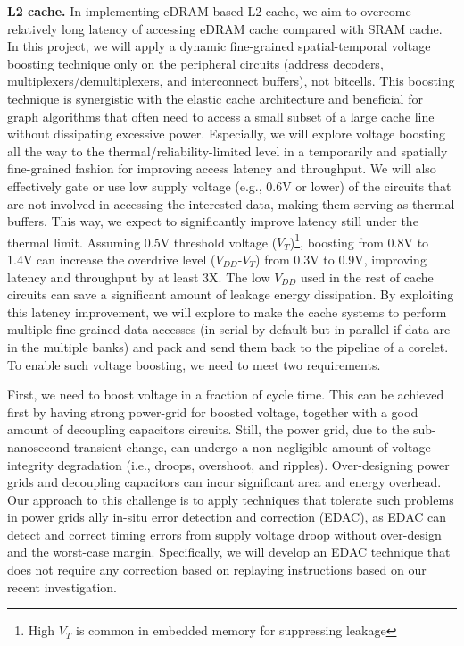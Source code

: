 \noindent
\textbf{L2 cache.}
In implementing eDRAM-based L2 cache, we aim to %
overcome relatively long latency of accessing eDRAM cache compared with SRAM cache. 
In this project, %
we will apply a dynamic fine-grained spatial-temporal voltage boosting technique only on the peripheral circuits (address decoders, multiplexers/demultiplexers, and interconnect buffers), not bitcells. 
This boosting technique is synergistic with the elastic cache architecture and beneficial for graph algorithms that often need to access a small subset of a large cache line without dissipating excessive power. 
Especially, we will explore voltage boosting all the way to the thermal/reliability-limited level in a temporarily and spatially fine-grained fashion for improving access latency and throughput. 
We will also effectively gate or use low supply voltage (e.g., 0.6V or lower) of the circuits that are not involved in accessing the interested data, making them serving as thermal buffers. 
This way, we expect to significantly improve latency still under the thermal limit. 
Assuming 0.5V threshold voltage ($V_T$)\footnote{High $V_T$ is common in embedded memory for suppressing leakage}, boosting from 0.8V to 1.4V can increase the overdrive level ($V_{DD}$-$V_T$) from 0.3V to 0.9V, improving latency and throughput by at least 3X. 
The low $V_{DD}$ used in the rest of cache circuits can save a significant amount of leakage energy dissipation. 
By exploiting this latency improvement, we will explore to make the cache systems to perform multiple fine-grained data accesses (in serial by default but in parallel if data are in the multiple banks) and pack and send them back to the pipeline of a corelet. 
To enable such voltage boosting, we need to meet two requirements. 


First, we need to boost voltage in a fraction of cycle time. 
This can be achieved first by having strong power-grid for boosted voltage, together with a good amount of decoupling capacitors circuits. 
Still, the power grid, due to the sub-nanosecond transient change, can undergo a non-negligible amount of voltage integrity degradation (i.e., droops, overshoot, and ripples). 
Over-designing power grids and decoupling capacitors can incur significant area and energy overhead. 
Our approach to this challenge is to apply techniques that tolerate such problems in power grids
ally in-situ error detection and correction (EDAC), as EDAC can detect and correct timing errors from supply voltage droop without over-design and the worst-case margin. 
Specifically, we will develop an EDAC technique that does not require any correction based on replaying instructions based on our recent investigation.


